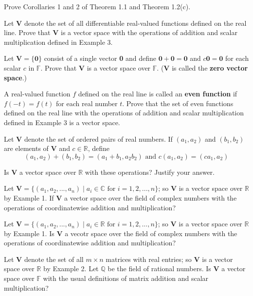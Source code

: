 \documentclass[11pt,largemargins]{homework}
\begin{document}
\question
Prove Corollaries 1 and 2 of Theorem 1.1 and Theorem 1.2(c).

\question
Let $\mathbf{V}$ denote the set of all differentiable real-valued functions defined on the real line. Prove that $\mathbf{V}$ is 
a vector space with the operations of addition and scalar multiplication defined in Example 3.

\question
Let $\mathbf{V}=\{\mathbf{0}\}$ consist of a single vector \textbf{0} and define 
$\mathbf{0}+\mathbf{0}=\mathbf{0}$ and $c\mathbf{0}=\mathbf{0}$ for each scalar $c$ in $\mathbb{F}$. 
Prove that \textbf{V} is a vector space over $\mathbb{F}$. ($\mathbf{V}$ is called the \textbf{zero vector space}.)

\question
A real-valued function $f$ defined on the real line is called an \textbf{even function} if $f(-t)=f(t)$ for each real number $t$. 
Prove that the set of even functions defined on the real line with the operations of addition and scalar multiplication 
defined in Example 3 is a vector space.

\question
Let \textbf{V} denote the set of ordered pairs of real numbers. If $(a_1,a_2)$ and $(b_1,b_2)$ are elements of \textbf{V} and 
$c\in \mathbb{R}$, define 
$$(a_1,a_2)+(b_1,b_2)=(a_1+b_1,a_2b_2)\text{ and } c(a_1,a_2)=(ca_1,a_2)$$

Is \textbf{V} a vector space over $\mathbb{R}$ with these operations? Justify your answer.

\question
Let $\mathbf{V}=\{(a_1,a_2,...,a_n)\;|\;a_i\in \mathbb{C} \text{ for } i=1,2,...,n\}$; 
so \textbf{V} is a vector space over $\mathbb{R}$ by Example 1.
If \textbf{V} a vector space over the field of complex numbers with the operations of coordinatewise addition and multiplication?

\question
Let $\mathbf{V}=\{(a_1,a_2,...,a_n)\;|\;a_i\in \mathbb{R} \text{ for } i=1,2,...,n\}$; 
so \textbf{V} is a vector space over $\mathbb{R}$ by Example 1.
Is \textbf{V} a vecotr space over the field of complex numbers with the operations of coordinatewise addition and multiplication?

\question
Let \textbf{V} denote the set of all $m\times n$ matrices with real entries; so \textbf{V} is a vector space over $\mathbb{R}$ by Example 2.
Let $\mathbb{Q}$ be the field of rational numbers. Is \textbf{V} a vector space over $\mathbb{F}$ with the usual definitions of matrix 
addition and scalar multiplication?
\end{document}
